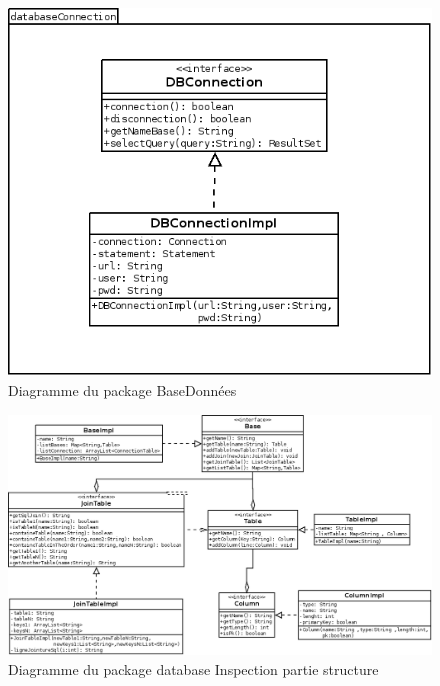 \documentclass[12pt]{report}
\begin{document}
\begin{figure}[h!]
\begin{center}
\includegraphics[scale=0.5]{bduml/databaseConnection.png}
\caption{Diagramme du package BaseDonnées}
\end{center}
\end{figure}

\begin{figure}[h!]
\begin{center}
\includegraphics[scale=0.4]{bduml/structDataBase.png}
\caption{Diagramme du package database Inspection partie structure}
\end{center}
\end{figure}
\end{document}
